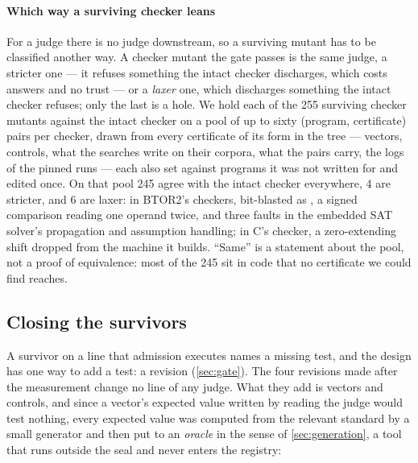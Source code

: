 \paragraph{Which way a surviving checker leans}
For a judge there is no judge downstream, so a surviving mutant has
to be classified another way. A checker mutant the gate passes is the
same judge, a stricter one --- it refuses something the intact
checker discharges, which costs answers and no trust --- or a
\emph{laxer} one, which discharges something the intact checker
refuses; only the last is a hole. We hold each of the 255 surviving
checker mutants against the intact checker on a pool of up to sixty
(program, certificate) pairs per checker, drawn from every
certificate of its form in the tree --- vectors, controls, what the
searches write on their corpora, what the pairs carry, the logs of
the pinned runs --- each also set against programs it was not
written for and edited once. On that pool 245 agree with the intact checker
everywhere, 4 are stricter, and 6 are laxer: in BTOR2's checkers,
 bit-blasted as , a signed comparison reading one
operand twice, and three faults in the embedded SAT solver's
propagation and assumption handling; in C's  checker,
a zero-extending shift dropped from the machine it builds. ``Same''
is a statement about the pool, not a proof of equivalence: most of
the 245 sit in code that no certificate we could find reaches.

\subsection{Closing the survivors}
\label{sec:closing}

A survivor on a line that admission executes names a missing test,
and the design has one way to add a test: a revision
(\cref{sec:gate}). The four revisions made after the measurement
change no line of any judge. What they add is vectors and controls,
and since a vector's expected value written by reading the judge
would test nothing, every expected value was computed from the
relevant standard by a small generator and then put to an
\emph{oracle} in the sense of \cref{sec:generation}, a tool that runs
outside the seal and never enters the registry:

